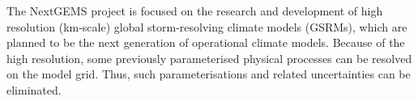 \documentclass[12pt,a4paper]{article}
\begin{document}

The NextGEMS project is focused on the research and
development of high resolution (km-scale) global storm-resolving climate models
(GSRMs), which are planned to be the next generation of operational climate
models. Because of the high resolution, some previously parameterised physical
processes can be resolved on the model grid. Thus, such parameterisations and
related uncertainties can be eliminated.
\end{document}
